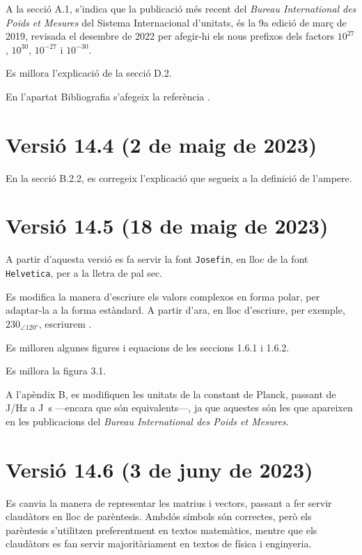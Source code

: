 A la secció A.1, s'indica que la publicació més recent del \textit{Bureau 	International des Poids et Mesures} del Sistema Internacional d'unitats, és la  9a edició de març de 2019, revisada el desembre de 2022 per afegir-hi els nous prefixos dels factors $10^{27}$,  $10^{30}$,  $10^{-27}$ i  $10^{-30}$.

Es millora l'explicació de la secció D.2.

En l'apartat Bibliografia s'afegeix la referència \cite{ALL}.

\section*{Versió 14.4 (2 de maig de 2023)}

En la secció B.2.2, es corregeix l'explicació que segueix a la definició de l'ampere.

\section*{Versió 14.5 (18 de maig de 2023)}

A partir d'aquesta versió es fa servir la font \texttt{Josefin}, en lloc de la font \texttt{Helvetica},  per a la lletra de pal sec.

Es modifica  la manera d'escriure els valors complexos en forma polar, per adaptar-la a la forma estàndard. A partir d'ara, en lloc d'escriure, per exemple, $230_{\angle\ang{120}}$, escriurem .

Es milloren algunes figures i equacions de les seccions 1.6.1 i 1.6.2.

Es millora la figura 3.1.

A l'apèndix B, es modifiquen les unitats de la constant de Planck, passant de \unit{J/Hz} a \unit{J.s} ---encara que són equivalents---, ja que aquestes són les que apareixen en les publicacions  del \textit{Bureau 	International des Poids et Mesures}.


\section*{Versió 14.6 (3 de juny de 2023)}

Es canvia la manera de representar les matrius i vectors, passant a fer servir claudàtors en lloc de parèntesis. Ambdós símbols són correctes, però els parèntesis s'utilitzen preferentment en textos matemàtics, mentre que els claudàtors es fan servir majoritàriament en textos de física i enginyeria.

